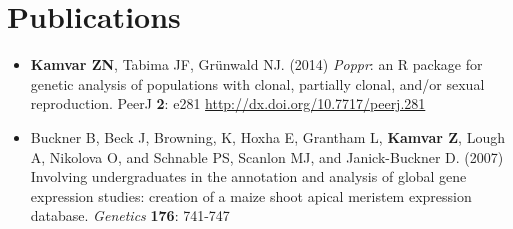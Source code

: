 \documentclass[11pt,letterpaper,sans]{moderncv} %
\begin{document}
\section{Publications}

\begin{itemize}

    \item \textbf{Kamvar ZN}, Tabima JF, Gr\"unwald NJ. (2014) \textit{Poppr}: an
	R package for genetic analysis of populations with clonal, partially clonal,
	and/or sexual reproduction. PeerJ \textbf{2}: e281
	\url{http://dx.doi.org/10.7717/peerj.281}

	\item Buckner B, Beck J, Browning, K, Hoxha E, Grantham L, \textbf{Kamvar Z}, Lough A,
	Nikolova O, and Schnable PS, Scanlon MJ, and Janick-Buckner D. (2007) Involving
	undergraduates in the annotation and analysis of global gene expression studies:
	creation of a maize shoot apical meristem expression database. \textit{Genetics}
	\textbf{176}: 741-747

\end{itemize}









\end{document}
